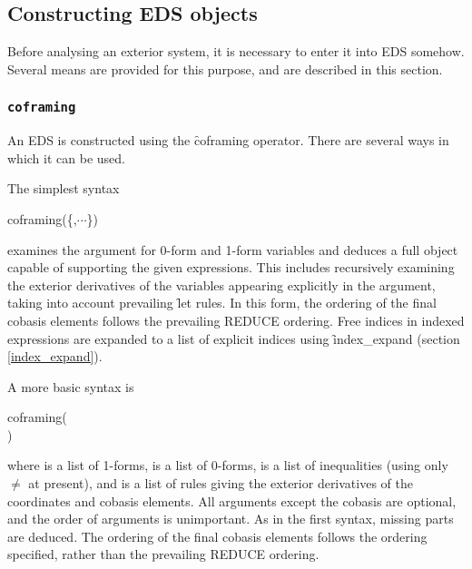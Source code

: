
\subsection{Constructing EDS objects}
\label{Constructing EDS objects}

Before analysing an exterior system, it is necessary to enter it into EDS
somehow. Several means are provided for this purpose, and are described in
this section.

\subsubsection{\tt coframing}
\label{coframing}

An EDS  is constructed using the \f{coframing}
operator. There are several ways in which it can be used. 

The simplest syntax
\begin{edssyntax}
	coframing(\{,$\cdots$\})
\end{edssyntax}
examines the argument for 0-form and 1-form variables and deduces a full
 object capable of supporting the given expressions. This
includes recursively examining the exterior derivatives of the variables
appearing explicitly in the argument, taking into account prevailing
\f{let} rules. In this form, the ordering of the final cobasis elements
follows the prevailing REDUCE ordering. Free indices in indexed expressions
are expanded to a list of explicit indices using \f{index\_expand} (section
\ref{index_expand}).

A more basic syntax is
\begin{edssyntax}
	coframing(
	\\\phantom \qquad\qquad\quad
	)
\end{edssyntax}
where  is a list of  1-forms,
 is a list of  0-forms,
 is a list of inequalities (using only $\neq$ at
present), and  is a list of rules giving the
exterior derivatives of the coordinates and cobasis elements. All
arguments except the cobasis are optional, and the order of arguments is
unimportant. As in the first syntax, missing parts are deduced. The
ordering of the final cobasis elements follows the ordering specified,
rather than the prevailing REDUCE ordering. 

